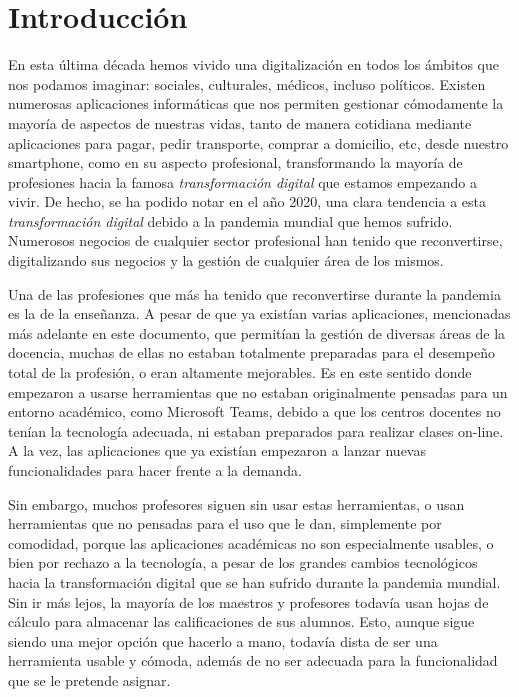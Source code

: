 
\chapter{Introducción}
\label{cap:Introduccion}
En esta última década hemos vivido una digitalización en todos los ámbitos que nos podamos imaginar: sociales, culturales, médicos, incluso políticos. Existen numerosas aplicaciones informáticas que nos permiten gestionar cómodamente la mayoría de aspectos de nuestras vidas, tanto de manera cotidiana mediante aplicaciones para pagar, pedir transporte, comprar a domicilio, etc, desde nuestro smartphone, como en su aspecto profesional, transformando la mayoría de profesiones hacia la famosa \textit{transformación digital} que estamos empezando a vivir. De hecho, se ha podido notar en el año 2020, una clara tendencia a esta \textit{transformación digital} debido a la pandemia mundial que hemos sufrido. Numerosos negocios de cualquier sector profesional han tenido que reconvertirse, digitalizando sus negocios y la gestión de cualquier área de los mismos.

Una de las profesiones que más ha tenido que reconvertirse durante la pandemia es la de la enseñanza. A pesar de que ya existían varias aplicaciones, mencionadas más adelante en este documento, que permitían la gestión de diversas áreas de la docencia, muchas de ellas no estaban totalmente preparadas para el desempeño total de la profesión, o eran altamente mejorables. Es en este sentido donde empezaron a usarse herramientas que no estaban originalmente pensadas para un entorno académico, como Microsoft Teams, debido a que los centros docentes no tenían la tecnología adecuada, ni estaban preparados para realizar clases on-line\cite{fletcher2020digital}. A la vez, las aplicaciones que ya existían empezaron a lanzar nuevas funcionalidades para hacer frente a la demanda.

Sin embargo, muchos profesores siguen sin usar estas herramientas, o usan herramientas que no pensadas para el uso que le dan, simplemente por comodidad, porque las aplicaciones académicas no son especialmente usables, o bien por rechazo a la tecnología, a pesar de los grandes cambios tecnológicos hacia la transformación digital que se han sufrido durante la pandemia mundial. Sin ir más lejos, la mayoría de los maestros y profesores todavía usan hojas de cálculo para almacenar las calificaciones de sus alumnos. Esto, aunque sigue siendo una mejor opción que hacerlo a mano, todavía dista de ser una herramienta usable y cómoda, además de no ser adecuada para la funcionalidad que se le pretende asignar.

